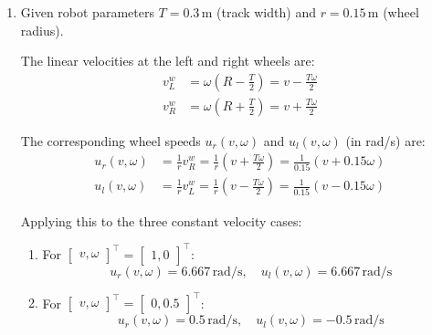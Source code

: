 \begin{enumerate}[label=\textbf{(\alph*)}]
    \textbf{Observations:} The angular rate $\omega(t)$ has a bias/offset of $0.2\,\text{rad/s}$, so it produces an overall net counter-clockwise trajectory while the $0.6\cos(t)$ component periodically wiggles the curvature. Coupled with the oscillating speed $v(t)$, the robot traces an undulating, complex, yet periodic trajectory.

    \item Given robot parameters $T = 0.3\,\text{m}$ (track width) and $r = 0.15\,\text{m}$ (wheel radius).

    The linear velocities at the left and right wheels are:
    \begin{align}
        v_L^w &= \omega\left(R - \frac{T}{2}\right) = v - \frac{T\omega}{2} \\
        v_R^w &= \omega\left(R + \frac{T}{2}\right) = v + \frac{T\omega}{2}
    \end{align}

    The corresponding wheel speeds $u_r(v, \omega)$ and $u_l(v, \omega)$ (in rad/s) are:
    \begin{align}
        u_r(v, \omega) &= \frac{1}{r} v_R^w = \frac{1}{r}\left(v + \frac{T\omega}{2}\right) = \frac{1}{0.15}(v + 0.15\omega) \label{eq:ur} \\
        u_l(v, \omega) &= \frac{1}{r} v_L^w = \frac{1}{r}\left(v - \frac{T\omega}{2}\right) = \frac{1}{0.15}(v - 0.15\omega) \label{eq:ul}
    \end{align}

    Applying this to the three constant velocity cases:
    \begin{enumerate}[label=\arabic*.]
        \item For $\begin{bmatrix} v, \omega \end{bmatrix}^\top = \begin{bmatrix} 1, 0 \end{bmatrix}^\top$:
        \begin{equation*}
            u_r(v, \omega) = 6.667\,\text{rad/s}, \quad u_l(v, \omega) = 6.667\,\text{rad/s}
        \end{equation*}

        \item For $\begin{bmatrix} v, \omega \end{bmatrix}^\top = \begin{bmatrix} 0, 0.5 \end{bmatrix}^\top$:
        \begin{equation*}
            u_r(v, \omega) = 0.5\,\text{rad/s}, \quad u_l(v, \omega) = -0.5\,\text{rad/s}
        \end{equation*}


\end{enumerate}
\end{enumerate}
